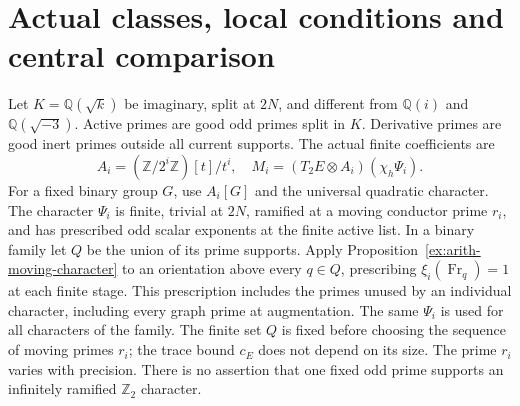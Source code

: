 \documentclass[11pt]{article}
\theoremstyle{definition}
\theoremstyle{remark}
\newcommand{\Q}{\mathbb Q}
\newcommand{\Z}{\mathbb Z}
\begin{document}
\section{Actual classes, local conditions and central comparison}
\label{sec:arithmetic}
Let $K=\Q(\sqrt k)$ be imaginary, split at $2N$, and different from
$\Q(i)$ and $\Q(\sqrt{-3})$. Active primes are good odd primes split
in $K$. Derivative primes are good inert primes outside all current
supports. The actual finite coefficients are
\[
 A_i=(\Z/2^i\Z)[t]/t^i,\quad
 M_i=(T_2E\otimes A_i)(\chi_h\Psi_i).
\]
For a fixed binary group $G$, use $A_i[G]$ and the universal quadratic
character. The character $\Psi_i$ is finite, trivial at $2N$, ramified
at a moving conductor prime $r_i$, and has prescribed odd scalar
exponents at the finite active list. In a binary family let $Q$ be
the union of its prime supports. Apply
Proposition~\ref{ex:arith-moving-character} to an orientation above
every $q\in Q$, prescribing $\xi_i(\operatorname{Fr}_q)=1$ at each
finite stage. This prescription includes the primes unused by an
individual character, including every graph prime at augmentation.
The same $\Psi_i$ is used for all characters of the family. The finite
set $Q$ is fixed before choosing the sequence of moving primes $r_i$;
the trace bound $c_E$ does not depend on its size. The prime $r_i$
varies with precision. There is no assertion
that one fixed odd prime supports an infinitely ramified $\Z_2$ character.
\end{document}

